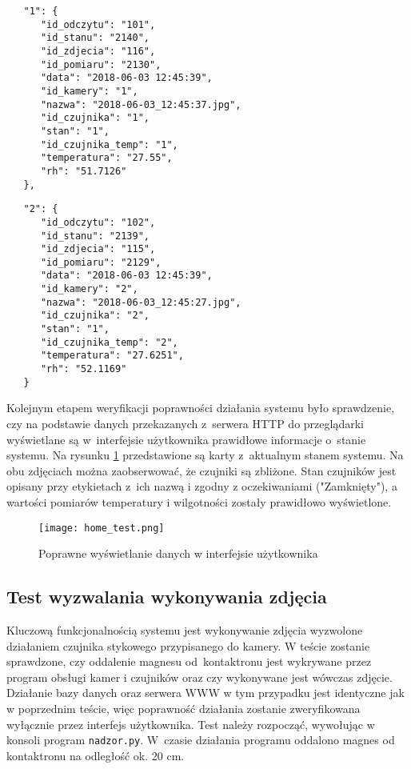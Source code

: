 \documentclass[a4paper,11pt,twoside]{article}
\begin{document}
\begin{minipage}{.5\textwidth}
\begin{lstlisting}
   "1": {
      "id_odczytu": "101",
      "id_stanu": "2140",
      "id_zdjecia": "116",
      "id_pomiaru": "2130",
      "data": "2018-06-03 12:45:39",
      "id_kamery": "1",
      "nazwa": "2018-06-03_12:45:37.jpg",
      "id_czujnika": "1",
      "stan": "1",
      "id_czujnika_temp": "1",
      "temperatura": "27.55",
      "rh": "51.7126"
   },
\end{lstlisting}
\end{minipage}\hfill
\begin{minipage}{.5\textwidth}
\begin{lstlisting}
   "2": {
      "id_odczytu": "102",
      "id_stanu": "2139",
      "id_zdjecia": "115",
      "id_pomiaru": "2129",
      "data": "2018-06-03 12:45:39",
      "id_kamery": "2",
      "nazwa": "2018-06-03_12:45:27.jpg",
      "id_czujnika": "2",
      "stan": "1",
      "id_czujnika_temp": "2",
      "temperatura": "27.6251",
      "rh": "52.1169"
   }
\end{lstlisting}
\end{minipage}

Kolejnym etapem weryfikacji poprawności działania systemu było sprawdzenie, czy na podstawie danych przekazanych z~serwera HTTP do przeglądarki wyświetlane są w~interfejsie użytkownika prawidłowe informacje o~stanie systemu. Na rysunku \ref{fig: home_test} przedstawione są karty z~aktualnym stanem systemu. Na obu zdjęciach można zaobserwować, że czujniki są zbliżone. Stan czujników jest opisany przy etykietach z~ich nazwą i zgodny z oczekiwaniami ("Zamknięty"), a wartości pomiarów temperatury i wilgotności zostały prawidłowo wyświetlone.

\begin{figure}
\begin{center}
\texttt{[image: home\_test.png]}
\caption{Poprawne wyświetlanie danych w interfejsie użytkownika}
\label{fig: home_test}
\end{center}
\end{figure}

\subsection{Test wyzwalania wykonywania zdjęcia}
Kluczową funkcjonalnością systemu jest wykonywanie zdjęcia wyzwolone działaniem czujnika stykowego przypisanego do kamery. W teście zostanie sprawdzone, czy oddalenie magnesu od~kontaktronu jest wykrywane przez program obsługi kamer i czujników oraz czy wykonywane jest wówczas zdjęcie. Działanie bazy danych oraz serwera WWW w tym przypadku jest identyczne jak w poprzednim teście, więc poprawność działania zostanie zweryfikowana wyłącznie przez interfejs użytkownika. Test należy rozpocząć, wywołując w konsoli program \texttt{nadzor.py}. W~czasie działania programu oddalono magnes od kontaktronu na odległość ok. 20 cm.
\end{document}

